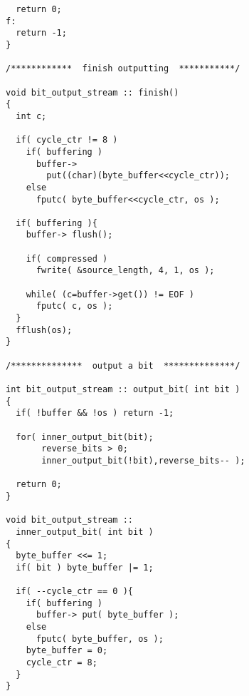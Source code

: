\begin{verbatim}
  return 0;
f:
  return -1;
}

/************  finish outputting  ***********/

void bit_output_stream :: finish()
{
  int c;

  if( cycle_ctr != 8 )
    if( buffering )
      buffer->
        put((char)(byte_buffer<<cycle_ctr));
    else
      fputc( byte_buffer<<cycle_ctr, os );

  if( buffering ){
    buffer-> flush();

    if( compressed )
      fwrite( &source_length, 4, 1, os );

    while( (c=buffer->get()) != EOF )
      fputc( c, os );
  }
  fflush(os);
}

/**************  output a bit  **************/

int bit_output_stream :: output_bit( int bit )
{
  if( !buffer && !os ) return -1;

  for( inner_output_bit(bit);
       reverse_bits > 0;
       inner_output_bit(!bit),reverse_bits-- );

  return 0;
}

void bit_output_stream ::
  inner_output_bit( int bit )
{
  byte_buffer <<= 1;
  if( bit ) byte_buffer |= 1;

  if( --cycle_ctr == 0 ){
    if( buffering )
      buffer-> put( byte_buffer );
    else
      fputc( byte_buffer, os );
    byte_buffer = 0;
    cycle_ctr = 8;
  }
}
\end{verbatim}
